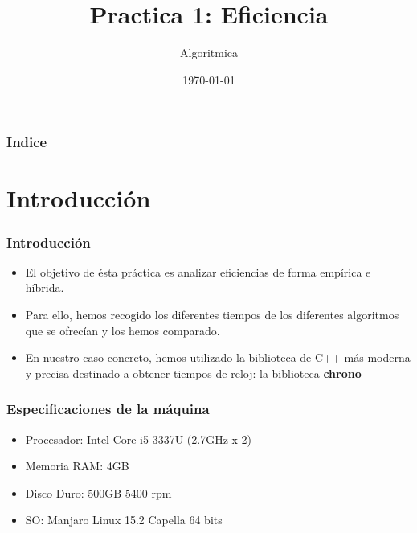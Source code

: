 \documentclass{beamer}
\title[Practica 1]{Practica 1: Eficiencia} %
\author{Algoritmica} %
\institute[UGR] %
{
Universidad de Granada \\ %
\medskip

}
\date{\today} %
\begin{document}
\begin{frame}
\titlepage %
\end{frame}

\begin{frame}
\frametitle{Indice} %
\tableofcontents %
\end{frame}


\section{Introducción }
\begin{frame}
	\frametitle{Introducción}
	\begin{itemize}
		\item El objetivo de ésta práctica es analizar eficiencias de forma empírica e híbrida.
		\item Para ello, hemos recogido los diferentes tiempos de los diferentes algoritmos que se ofrecían y los hemos comparado.
		\item En nuestro caso concreto, hemos utilizado la biblioteca de C++ más moderna y precisa destinado a obtener tiempos de reloj: la biblioteca \textbf{chrono}
		\end{itemize}
\end{frame}
\begin{frame}
	\frametitle{Especificaciones de la máquina}
	\begin{itemize}
		
		\item Procesador: Intel Core i5-3337U (2.7GHz x 2)
		\item Memoria RAM: 4GB
	    \item Disco Duro: 500GB 5400 rpm
		\item SO: Manjaro Linux 15.2 Capella 64 bits
	\end{itemize}
	
\end{frame}
\end{document}
